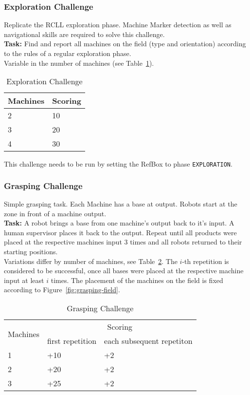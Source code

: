 \documentclass[12pt,twoside]{article}
\newcommand{\reffig}[1]{Figure~\ref{#1}}
\newcommand{\reftab}[1]{Table~\ref{#1}}
\begin{document}
\subsubsection{Exploration Challenge}\label{sec:challenge-exploration}
Replicate the RCLL exploration phase.
Machine Marker detection as well as navigational skills are required to solve
this challenge.\\
\textbf{Task:} Find and report all machines on the field (type and orientation)
according to the rules of a regular exploration phase.
\\
Variable in the number of machines
(see \reftab{tab:challenge-exploration}).
\begin{table}[!htb]
 \centering
 \begin{tabular}{l|l}
  Machines & Scoring \\\hline
  2   & 10 \\
  3   & 20 \\
  4   & 30 \\
 \end{tabular}
 \caption{Exploration Challenge}
 \label{tab:challenge-exploration}
\end{table}
This challenge needs to be run by setting the RefBox to phase
\texttt{EXPLORATION}.

\subsubsection{Grasping Challenge}\label{sec:challenge-grasping}
Simple grasping task.
Each Machine has a base at output.
Robots start at the zone in front of a machine output.\\
\textbf{Task:} A robot brings a base from one machine's output back to it's
input. A human supervisor places it back to the output. Repeat until all
products were placed at the respective machines input 3 times and all robots
returned to their starting positions. \\
Variations differ by number of machines, see
\reftab{tab:challenge-grasping}. The $i$-th repetition is considered to be
successful, once all bases were placed at the respective machine input
at least $i$ times.
The placement of the machines on the field is fixed according to
\reffig{fig:grasping-field}.

\begin{table}[!htb]
\centering
 \begin{tabular}{l|l|l}
  \multirow{2}{*}{Machines}
  & \multicolumn{2}{c}{Scoring} \\\cline{2-3}
  & first repetition
  & each subsequent repetiton  \\\hline\hline
  1 & +10 & +2 \\
  2 & +20 & +2 \\
  3 & +25 & +2 \\
 \end{tabular}
 \caption{Grasping Challenge}
 \label{tab:challenge-grasping}
\end{table}
\end{document}
